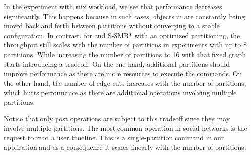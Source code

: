 
In the experiment with mix workload, we see that \dssmr{} performance decreases significantly.
This happens because in such cases, objects in \dssmr{} are constantly being moved back and forth 
between partitions without converging to a stable configuration.
In contrast, for \dynastar and S-SMR* with an optimized partitioning, the throughput still scales with 
the number of partitions in experiments with up to 8 partitions. 
While increasing the number of partitions to 16 with that fixed graph starts introducing a tradeoff. 
On the one hand, additional partitions should improve performance as there are more resources to execute the commands.
On the other hand, the number of edge cuts increases with the number of partitions, which hurts performance 
as there are additional operations involving multiple partitions.

Notice that only post operations are subject to this tradeoff since they may involve multiple partitions.
The most common operation in social networks is the request to read a user timeline. This is a single-partition
command in our application and as a consequence it scales linearly with the number of partitions.




